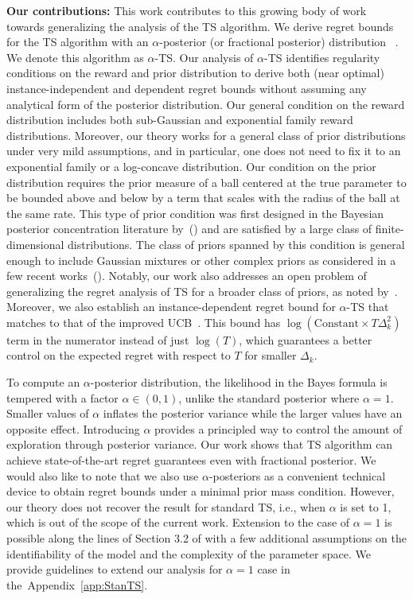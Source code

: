 \documentclass[11pt]{article}
\begin{document}
\textbf{Our contributions:} This work contributes to this growing body of work towards generalizing the analysis of the TS algorithm. We derive regret bounds for the TS algorithm with an $\alpha$-posterior (or fractional posterior) distribution ~\citep{bhattacharya2019bayesian}. We denote this algorithm as $\alpha$-TS. Our analysis of $\alpha$-TS identifies regularity conditions on the reward and prior distribution to derive both (near optimal) instance-independent and dependent regret bounds without assuming any analytical form of the posterior distribution. Our general condition on the reward distribution includes both sub-Gaussian and exponential family reward distributions. Moreover, our theory works for a general class of prior distributions under very mild assumptions, and in particular, one does not need to fix it to an exponential family or a log-concave distribution.  Our condition on the prior distribution requires the prior measure of a ball centered at the true parameter to be bounded above and below by a term that scales with the radius of the ball at the same rate. This type of prior condition was first designed  in the Bayesian posterior concentration literature by~(\cite{GGV}) and are satisfied by a large class of finite-dimensional distributions. The class of priors spanned by this condition is general enough to include Gaussian mixtures or other complex priors as considered in a few recent works~(\cite{hong22b,urteaga2018nonparametric}). Notably, our work also addresses an open problem of generalizing the regret analysis of TS for a broader class of priors, as noted by~\cite[page 69, line 2]{Russo20}. Moreover, we also establish an instance-dependent regret bound for $\alpha$-TS that matches to that of the improved UCB~\citep{Auer2010}. This bound has $\log(\text{Constant}\times T \Delta_k^2)$ term in the numerator instead of just $\log(T)$, which guarantees a better control on the expected regret with respect to $T$ for smaller $\Delta_k$. 

To compute an $\alpha$-posterior distribution, the likelihood in the Bayes formula is tempered with a factor $\alpha\in(0,1)$, unlike the standard posterior where $\alpha=1$.
Smaller values of $\alpha$ inflates the posterior variance while the larger values have an opposite effect. Introducing $\alpha$ provides a principled way to control the amount of exploration through posterior variance. Our work shows that TS algorithm can achieve state-of-the-art regret guarantees even with fractional posterior. We would also like to note that we also use $\alpha$-posteriors as a convenient technical device
to obtain regret bounds under a minimal prior mass condition.  However, our theory does not recover the result for standard TS, i.e., when $\alpha$ is set to 1, which is out of the scope of the current work. Extension to the case of $\alpha =1$ is possible along the lines of Section 3.2 of \cite{Yang2020} with a few additional assumptions on the identifiability of the model and the complexity of the parameter space. We provide guidelines to extend our analysis for $\alpha=1$ case in the~Appendix~\ref{app:StanTS}.
\end{document}
